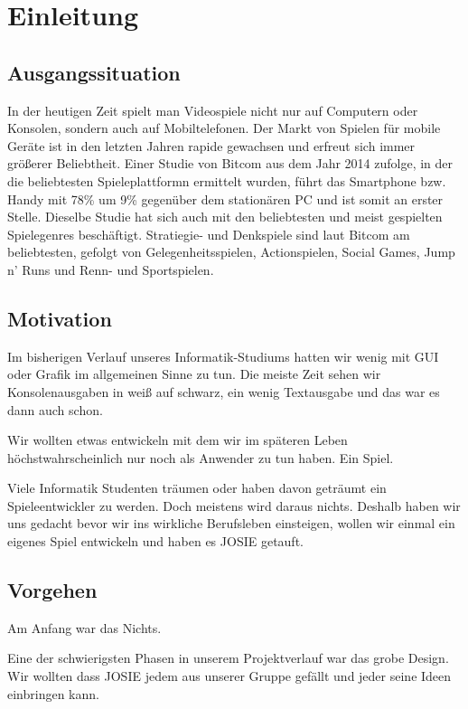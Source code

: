 \chapter{Einleitung}\label{ch:intro}

\section{Ausgangssituation}

In der heutigen Zeit spielt man Videospiele nicht nur auf Computern oder Konsolen, sondern auch auf Mobiltelefonen. Der Markt von Spielen für mobile Geräte ist in den letzten Jahren rapide gewachsen und erfreut sich immer größerer Beliebtheit. Einer Studie von Bitcom aus dem Jahr 2014 zufolge, in der die beliebtesten Spieleplattformn ermittelt wurden, führt das Smartphone bzw. Handy mit 78\% um 9\% gegenüber dem stationären PC und ist somit an erster Stelle. Dieselbe Studie hat sich auch mit den beliebtesten und meist gespielten Spielegenres beschäftigt. Stratiegie- und Denkspiele sind laut Bitcom am beliebtesten, gefolgt von Gelegenheitsspielen, Actionspielen, Social Games, Jump n' Runs und Renn- und Sportspielen.




\section{Motivation}

Im bisherigen Verlauf unseres Informatik-Studiums hatten wir wenig mit GUI oder Grafik im allgemeinen Sinne zu tun. Die meiste Zeit sehen wir Konsolenausgaben in weiß auf schwarz, ein wenig Textausgabe und das war es dann auch schon. 

Wir wollten etwas entwickeln mit dem wir im späteren Leben höchstwahrscheinlich nur noch als Anwender zu tun haben. Ein Spiel. 

Viele Informatik Studenten träumen oder haben davon geträumt ein Spieleentwickler zu werden. Doch meistens wird daraus nichts. Deshalb haben wir uns gedacht bevor wir ins wirkliche Berufsleben einsteigen, wollen wir einmal ein eigenes Spiel entwickeln und haben es JOSIE getauft.

\section{Vorgehen}

Am Anfang war das Nichts.

Eine der schwierigsten Phasen in unserem Projektverlauf war das grobe Design. Wir wollten dass JOSIE jedem aus unserer Gruppe gefällt und jeder seine Ideen einbringen kann.

